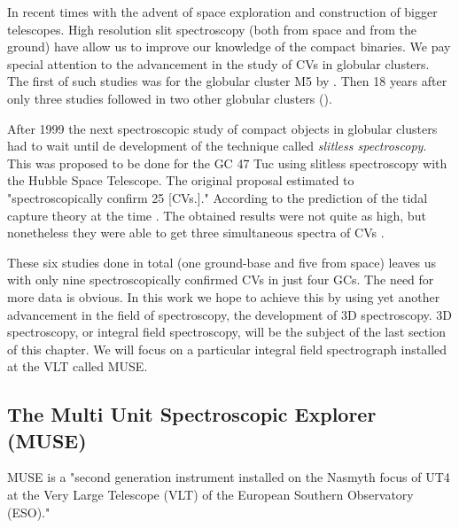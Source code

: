 In recent times with the advent of space exploration and construction of bigger telescopes. High resolution slit spectroscopy (both from space and from the ground) have allow us to improve our knowledge of the compact binaries. We pay special attention to the advancement in the study of CVs in globular clusters. The first of such studies was for the globular cluster M5 by \cite{margon_m5_1981}. Then 18 years after only three studies followed in two other globular clusters (\cite{deutsch_serendipitous_1999, grindlay_spectroscopic_1995,edmonds_cataclysmic_1999}).  

After 1999 the next spectroscopic study of compact objects in globular clusters had to wait until de development of the technique called \emph{slitless spectroscopy}. This was proposed to be done for the GC 47 Tuc using slitless spectroscopy with the Hubble Space Telescope. The original proposal estimated to "spectroscopically confirm 25 [CVs.]." According to the prediction of the tidal capture theory at the time \cite{knigge_definitive_1999}. The obtained results were not quite as high, but nonetheless they were able to get three simultaneous spectra of CVs \citep{knigge_farultraviolet_2003,knigge_stellar_2008}.


These six studies done in total (one ground-base and five from space) leaves us with only nine spectroscopically confirmed CVs in just four GCs. The need for more data is obvious. In this work we hope to achieve this by using yet another advancement in the field of spectroscopy, the development of 3D spectroscopy. 3D spectroscopy, or integral field spectroscopy,  will be the subject of the last section of this chapter. We will focus on a particular integral field spectrograph installed at the VLT called MUSE. 


\subsection{The Multi Unit Spectroscopic Explorer (MUSE)}

MUSE is a "second generation instrument installed on the Nasmyth focus of UT4 at the Very Large Telescope (VLT) of the European Southern Observatory (ESO)." \citep{bacon_muse_2010,bacon_muse_2014}


